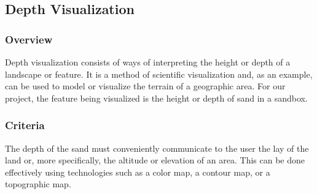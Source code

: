 \subsection{Depth Visualization}
\subsubsection{Overview}
Depth visualization consists of ways of interpreting the height or depth of a landscape or feature.
It is a method of scientific visualization and, as an example, can be used to model or visualize the terrain of a geographic area.
For our project, the feature being visualized is the height or depth of sand in a sandbox.

\subsubsection{Criteria}
The depth of the sand must conveniently communicate to the user the lay of the land or, more specifically, the altitude or elevation of an area.
This can be done effectively using technologies such as a color map, a contour map, or a topographic map.

